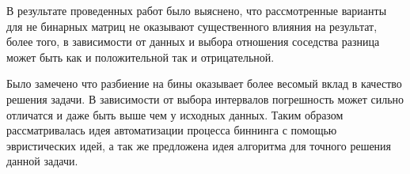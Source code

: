 \documentclass[a4paper,12pt]{diplom}
\begin{document}
В результате проведенных работ было выяснено, что рассмотренные варианты для не бинарных матриц не оказывают существенного влияния на 
результат, более того, в зависимости от данных и выбора отношения соседства разница может быть как и положительной так и отрицательной. 

Было замечено что разбиение на бины оказывает более весомый вклад в качество решения задачи. В зависимости от выбора интервалов погрешность может 
сильно отличатся и даже быть выше чем у исходных данных. Таким образом рассматривалась идея автоматизации процесса биннинга с помощью эвристических 
идей, а так же предложена идея алгоритма для точного решения данной задачи.


\renewcommand\bibname{Список литературы}



\appendix
	




%  

% 

\end{document}
